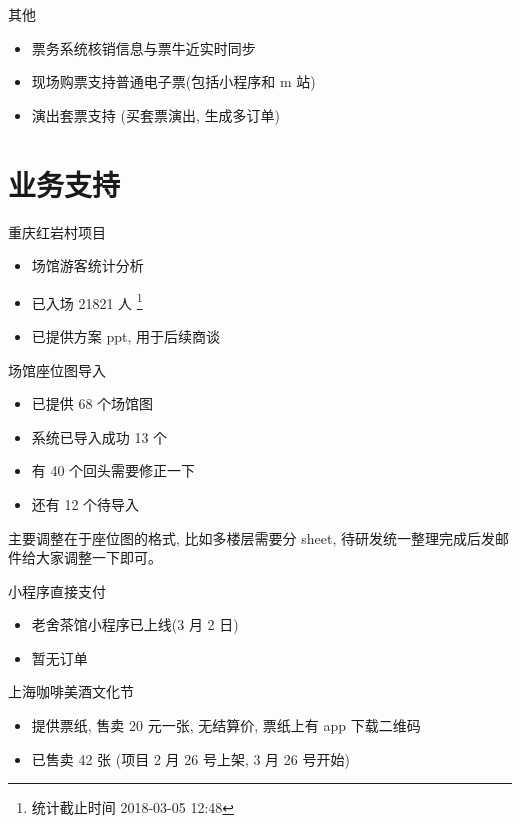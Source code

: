 \documentclass[presentation, bigger]{beamer}
\begin{document}
\begin{frame}[label={sec:orgca769ad}]{其他}
\begin{itemize}
\item 票务系统核销信息与票牛近实时同步
\item 现场购票支持普通电子票(包括小程序和 m 站)
\item 演出套票支持 (买套票演出, 生成多订单)
\end{itemize}
\end{frame}

\section{业务支持}
\label{sec:org0405f5a}
\begin{frame}[label={sec:orgaedba16}]{重庆红岩村项目}
\begin{itemize}
\item 场馆游客统计分析
\item 已入场 21821 人 \footnote{统计截止时间 2018-03-05 12:48}
\item 已提供方案 ppt, 用于后续商谈
\end{itemize}
\end{frame}

\begin{frame}[label={sec:org82471f6}]{场馆座位图导入}
\begin{itemize}
\item 已提供 68 个场馆图
\item 系统已导入成功 13 个
\item 有 40 个回头需要修正一下
\item 还有 12 个待导入
\end{itemize}

主要调整在于座位图的格式, 比如多楼层需要分 sheet, 待研发统一整理完成后发邮件给大家调整一下即可。
\end{frame}

\begin{frame}[label={sec:org1286d31}]{小程序直接支付}
\begin{itemize}
\item 老舍茶馆小程序已上线(3 月 2 日)
\item 暂无订单
\end{itemize}
\end{frame}

\begin{frame}[label={sec:org97a9a4c}]{上海咖啡美酒文化节}
\begin{itemize}
\item 提供票纸, 售卖 20 元一张, 无结算价, 票纸上有 app 下载二维码
\item 已售卖 42 张 (项目 2 月 26 号上架, 3 月 26 号开始)
\end{itemize}
\end{frame}
\end{document}
